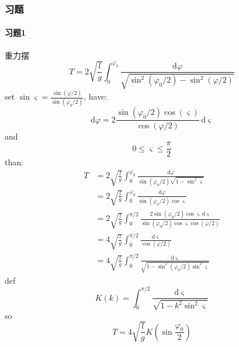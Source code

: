 \documentclass[12pt]{report}
\begin{document}
\newpage
\subsubsection{习题}
\paragraph{习题1}重力摆
$$
T=2\sqrt{\frac{l}{g}} \int_{0}^{\varphi_0} \frac{\mathrm{d}\varphi}{\sqrt{\sin^2(\varphi_0/2)-\sin^2(\varphi /2)}}
$$
set $\sin \varsigma=\frac{\sin (\varphi /2)}{\sin (\varphi_0 /2)}$, have:
$$\mathrm{d}\varphi =2\frac{\sin(\varphi_0 /2)\cos(\varsigma)}{\cos(\varphi /2)}\,\mathrm{d}\varsigma $$
and 
$$0 \leq \varsigma \leq \frac{\pi}{2}$$
than:
\begin{equation*}
    \begin{array}{ll}
        T&=\displaystyle{2\sqrt{\frac{l}{g}} \int_{0}^{\varphi_0} \frac{\mathrm{d}\varphi}{\sin (\varphi_0 /2) \sqrt{1-\sin^2 \varsigma}}}\\
        &=\displaystyle{2\sqrt{\frac{l}{g}} \int_{0}^{\varphi_0} \frac{\mathrm{d}\varphi}{\sin (\varphi_0 /2) \cos \varsigma}}\\
        &=\displaystyle{2\sqrt{\frac{l}{g}} \int_{0}^{\pi /2} \frac{2\sin(\varphi_0 /2)\cos \varsigma \,\mathrm{d}\varsigma}{\sin(\varphi_0 /2)\cos \varsigma \cos(\varphi/2)}}\\
        &=\displaystyle{4\sqrt{\frac{l}{g}} \int_{0}^{\pi /2} \frac{\mathrm{d}\varsigma}{\cos(\varphi/2)}}\\
        &=\displaystyle{4\sqrt{\frac{l}{g}} \int_{0}^{\pi /2} \frac{\mathrm{d}\varsigma}{\sqrt{1-\sin^2(\varphi_0 /2)\sin^2 \varsigma}}}
    \end{array}
\end{equation*}
def
$$
K(k)=\int_{0}^{\pi /2} \frac{\mathrm{d}\varsigma}{\sqrt{1-k^2\sin^2 \varsigma}}
$$
so
$$
T=4\sqrt{\frac{l}{g}} K(\sin\frac{\varphi_0}{2})
$$
\end{document}
